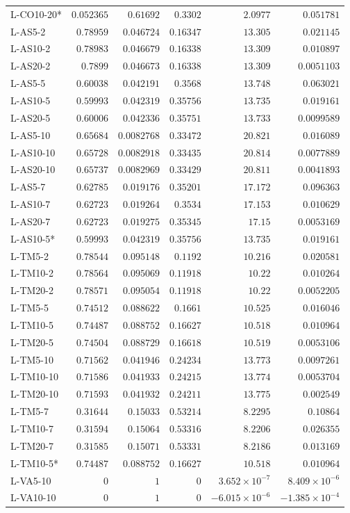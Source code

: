 \begin{longtable}{lrrrrr}
L-CO10-20* & $0.052365$ & $0.61692$ & $0.3302$ & $2.0977$ & $0.051781$ \\
L-AS5-2 & $0.78959$ & $0.046724$ & $0.16347$ & $13.305$ & $0.021145$ \\
L-AS10-2 & $0.78983$ & $0.046679$ & $0.16338$ & $13.309$ & $0.010897$ \\
L-AS20-2 & $0.7899$ & $0.046673$ & $0.16338$ & $13.309$ & $0.0051103$ \\
L-AS5-5 & $0.60038$ & $0.042191$ & $0.3568$ & $13.748$ & $0.063021$ \\
L-AS10-5 & $0.59993$ & $0.042319$ & $0.35756$ & $13.735$ & $0.019161$ \\
L-AS20-5 & $0.60006$ & $0.042336$ & $0.35751$ & $13.733$ & $0.0099589$ \\
L-AS5-10 & $0.65684$ & $0.0082768$ & $0.33472$ & $20.821$ & $0.016089$ \\
L-AS10-10 & $0.65728$ & $0.0082918$ & $0.33435$ & $20.814$ & $0.0077889$ \\
L-AS20-10 & $0.65737$ & $0.0082969$ & $0.33429$ & $20.811$ & $0.0041893$ \\
L-AS5-7 & $0.62785$ & $0.019176$ & $0.35201$ & $17.172$ & $0.096363$ \\
L-AS10-7 & $0.62723$ & $0.019264$ & $0.3534$ & $17.153$ & $0.010629$ \\
L-AS20-7 & $0.62723$ & $0.019275$ & $0.35345$ & $17.15$ & $0.0053169$ \\
L-AS10-5* & $0.59993$ & $0.042319$ & $0.35756$ & $13.735$ & $0.019161$ \\
L-TM5-2 & $0.78544$ & $0.095148$ & $0.1192$ & $10.216$ & $0.020581$ \\
L-TM10-2 & $0.78564$ & $0.095069$ & $0.11918$ & $10.22$ & $0.010264$ \\
L-TM20-2 & $0.78571$ & $0.095054$ & $0.11918$ & $10.22$ & $0.0052205$ \\
L-TM5-5 & $0.74512$ & $0.088622$ & $0.1661$ & $10.525$ & $0.016046$ \\
L-TM10-5 & $0.74487$ & $0.088752$ & $0.16627$ & $10.518$ & $0.010964$ \\
L-TM20-5 & $0.74504$ & $0.088729$ & $0.16618$ & $10.519$ & $0.0053106$ \\
L-TM5-10 & $0.71562$ & $0.041946$ & $0.24234$ & $13.773$ & $0.0097261$ \\
L-TM10-10 & $0.71586$ & $0.041933$ & $0.24215$ & $13.774$ & $0.0053704$ \\
L-TM20-10 & $0.71593$ & $0.041932$ & $0.24211$ & $13.775$ & $0.002549$ \\
L-TM5-7 & $0.31644$ & $0.15033$ & $0.53214$ & $8.2295$ & $0.10864$ \\
L-TM10-7 & $0.31594$ & $0.15064$ & $0.53316$ & $8.2206$ & $0.026355$ \\
L-TM20-7 & $0.31585$ & $0.15071$ & $0.53331$ & $8.2186$ & $0.013169$ \\
L-TM10-5* & $0.74487$ & $0.088752$ & $0.16627$ & $10.518$ & $0.010964$ \\
L-VA5-10 & $0$ & $1$ & $0$ & $3.652\times 10^{-7}$ & $8.409\times 10^{-6}$ \\
L-VA10-10 & $0$ & $1$ & $0$ & $-6.015\times 10^{-6}$ & $-1.385\times 10^{-4}$ \\
\hline\end{longtable}\endgroup
